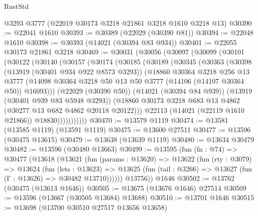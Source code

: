 \begin{lexlean}{RustStd}
\begin{coremodule}
    @3293
    @3777
    (@22019 @30173 @3218 @21861 @3218 @1610 @3218 @13)
@30390 := @22041 @1610
@30393 := @30389 (@22029 (@30390 @81))
@30394 := @22048 @1610
@30398 := @30393 (@14021 (@30394 @83 @934))
@30401 := @22055 @30173 @21861 @3218
@30469 := @30031
    (@30056
      (@30097
        (@30099
          (@30101
            (@30122
              (@30140
                (@30157
                  (@30174
                    (@30185
                      (@30189
                        (@30345
                          (@30363
                            (@30398
                              (@13919 (@30401 @934 @922 @8573 @3293))
                              (@18860
                                @30364
                                @3218
                                @256
                                @13
                                @3777
                                (@14098
                                  @30364
                                  @3218
                                  @50
                                  @13
                                  @50
                                  @3777
                                  (@14106 (@14107 @30364 @50))
                                  @16093)))
                            (@22029 (@30390 @50))
                            (@14021 (@30394 @84 @939))
                            (@13919 (@30401 @939 @83 @5948 @3293))
                            (@18860
                              @30173
                              @3218
                              @683
                              @13
                              @4862
                              (@30277 @13 @682 @4862 @20118 @20122)))
                          @22113
                          (@14021 (@22119 @1610 @21866))
                          @18830)))))))))))
@30470 := @13579 @1119
@30474 := @13581 (@13585 @1119) (@13591 @1119)
@30475 := @13600 @27511
@30477 := @13596 (@30475 @13615)
@30479 := @13638 (@13639 @1119)
@30480 := @13634 @30479
@30482 := @13596 (@30480 @13663)
@30499 := @13595
    (fun (fn : @74) =>
    @30477
      (@13618
        (@13621
          (fun (params : @13620) =>
          @13622
            (fun (rty : @3079) =>
            @13624
              (fun (lets : @13623) =>
              @13625 (fun (tail : @3266) => @13627 (fun (Γ : @13626) => @30482 @13710))))))
        @13756))
    @1646
@30502 := @13762 (@30475 (@13613 @1646))
@30505 := @13675 (@13676 @1646) @27514
@30509 := @13596 (@13667 (@30505 @13684) @13688)
@30510 := @13701 @1646
@30515 := @13698 (@13700 @30510 @27517 @13656 @13658)

\end{coremodule}
\end{lexlean}
